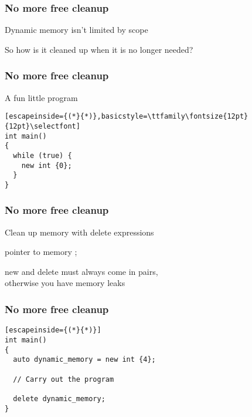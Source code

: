 \documentclass[14pt,a4paper,dvipsnames,usenames]{beamer}
\begin{document}
\begin{frame}
  \frametitle{No more free cleanup}

  Dynamic memory isn't limited by scope
  
  \vspace{1em}
  So how is it cleaned up when it is no longer needed?

  
\end{frame}

\begin{frame}[fragile]
  \frametitle{No more free cleanup}

  A fun little program

  \vspace{.5em}
  \begin{lstlisting}[escapeinside={(*}{*)},basicstyle=\ttfamily\fontsize{12pt}{12pt}\selectfont]
int main()
{
  while (true) {
    new int {0};
  }
}
  \end{lstlisting}

\end{frame}

\begin{frame}[fragile]
  \frametitle{No more free cleanup}

  Clean up memory with {\color{Marty}delete} expressions

  \vspace{.5em}
   \hspace{.2em} pointer to memory {\ttfamily;}

  \vspace{1.5em}
  {\color{FeebleWeek}new} and {\color{Marty}delete} must always come in pairs,\\
  otherwise you have memory leaks

\end{frame}

\begin{frame}[fragile]
  \frametitle{No more free cleanup}

  \begin{lstlisting}[escapeinside={(*}{*)}]
int main()
{
  auto dynamic_memory = new int {4};

  // Carry out the program

  delete dynamic_memory;
}
  \end{lstlisting}

\end{frame}
\end{document}
